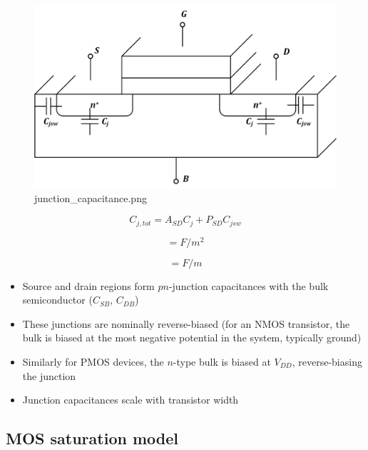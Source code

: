 \documentclass[11pt]{article}
\providecommand{\tightlist}{%
      \setlength{\itemsep}{0pt}\setlength{\parskip}{0pt}}
\begin{document}
    \begin{figure}
\centering
\includegraphics{junction_capacitance.png}
\caption{junction\_capacitance.png}
\end{figure}

    \begin{equation}
\boxed{C_{j,tot} = A_{SD}C_j + P_{SD}C_{jsw}}
\end{equation}

\begin{equation}
[C_j] = F/m^2
\end{equation}

\begin{equation}
[C_{jsw}] = F/m
\end{equation}

    \begin{itemize}
\tightlist
\item
  Source and drain regions form \(pn\)-junction capacitances with the
  bulk semiconductor (\(C_{SB}\), \(C_{DB}\))
\item
  These junctions are nominally reverse-biased (for an NMOS transistor,
  the bulk is biased at the most negative potential in the system,
  typically ground)
\item
  Similarly for PMOS devices, the \(n\)-type bulk is biased at
  \(V_{DD}\), reverse-biasing the junction
\item
  Junction capacitances scale with transistor width
\end{itemize}

    \hypertarget{mos-saturation-model}{%
\subsection{MOS saturation model}\label{mos-saturation-model}}
\end{document}
